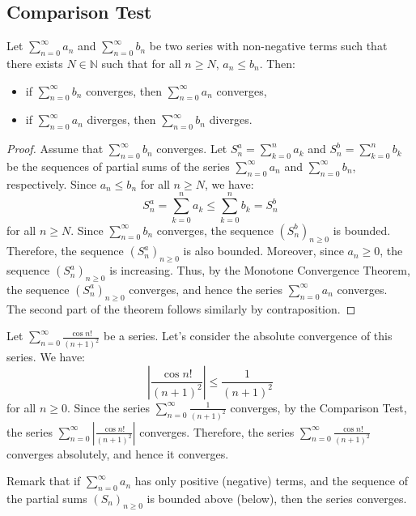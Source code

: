 \subsection{Comparison Test}
\begin{theorem}
    Let $\sum_{n=0}^{\infty} a_n$ and $\sum_{n=0}^{\infty} b_n$ be two series with non-negative terms such that there exists $N \in \mathbb{N}$ such that for all $n \geq N$, $a_n \leq b_n$. Then:
    \begin{itemize}[itemsep=1pt,label=$\circ$]
        \item if $\sum_{n=0}^{\infty} b_n$ converges, then $\sum_{n=0}^{\infty} a_n$ converges,
        \item if $\sum_{n=0}^{\infty} a_n$ diverges, then $\sum_{n=0}^{\infty} b_n$ diverges.
    \end{itemize}
\end{theorem}
\begin{proof}
    Assume that $\sum_{n=0}^{\infty} b_n$ converges. Let $S_n^a = \sum_{k=0}^n a_k$ and $S_n^b = \sum_{k=0}^n b_k$ be the sequences of partial sums of the series $\sum_{n=0}^{\infty} a_n$ and $\sum_{n=0}^{\infty} b_n$, respectively. Since $a_n \leq b_n$ for all $n \geq N$, we have:
    \[
        S_n^a = \sum_{k=0}^n a_k \leq \sum_{k=0}^n b_k = S_n^b
    \]
    for all $n \geq N$. Since $\sum_{n=0}^{\infty} b_n$ converges, the sequence $(S_n^b)_{n\geq 0}$ is bounded. Therefore, the sequence $(S_n^a)_{n\geq 0}$ is also bounded. Moreover, since $a_n \geq 0$, the sequence $(S_n^a)_{n\geq 0}$ is increasing. Thus, by the Monotone Convergence Theorem, the sequence $(S_n^a)_{n\geq 0}$ converges, and hence the series $\sum_{n=0}^{\infty} a_n$ converges. \\
    The second part of the theorem follows similarly by contraposition.
\end{proof}
\begin{eg}
    Let $\sum_{n = 0}^{\infty} \frac{\cos{n!}}{(n + 1)^2}$ be a series. Let's consider the absolute convergence of this series. We have:
    \[
        \left|\frac{\cos{n!}}{(n + 1)^2}\right| \leq \frac{1}{(n + 1)^2}
    \]
    for all $n \geq 0$. Since the series $\sum_{n = 0}^{\infty} \frac{1}{(n + 1)^2}$ converges, by the Comparison Test, the series $\sum_{n = 0}^{\infty} \left|\frac{\cos{n!}}{(n + 1)^2}\right|$ converges. Therefore, the series $\sum_{n = 0}^{\infty} \frac{\cos{n!}}{(n + 1)^2}$ converges absolutely, and hence it converges.
\end{eg}
Remark that if $\sum_{n = 0}^{\infty} a_n$ has only positive (negative) terms, and the sequence of the partial sums $(S_n)_{n\geq 0}$ is bounded above (below), then the series converges.

